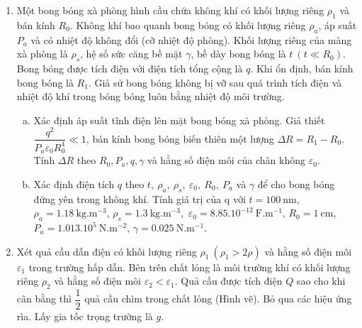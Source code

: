 \begin{vd}
\begin{enumerate}[1)]
    \item Một bong bóng xà phòng hình cầu chứa không khí có khối lượng riêng ${{\rho}_{1}}$ và bán kính ${{R}_{0}}$. Không khí bao quanh bong bóng có khối lượng riêng ${{\rho }_{a}}$, áp suất ${{P}_{a}}$ và có nhiệt độ không đổi (cỡ nhiệt độ phòng). Khối lượng riêng của màng xà phòng là ${{\rho }_{s}}$, hệ số sức căng bề mặt $\gamma $, bề dày bong bóng là $t~(t\ll {{R}_{0}})$. Bong bóng được tích điện với điện tích tổng cộng là $q$. Khi ổn định, bán kính bong bóng là ${{R}_{1}}$. Giả sử bong bóng không bị vỡ sau quá trình tích điện và nhiệt độ khí trong bóng bóng luôn bằng nhiệt độ môi trường.
    \begin{enumerate}[a)]
        \item Xác định áp suất tĩnh điện lên mặt bong bóng xà phòng. Giả thiết $\dfrac{{{q}^{2}}}{{{P}_{a}}{{\varepsilon }_{0}}R_{0}^{4}}\ll 1$, bán kính bong bóng biến thiên một lượng $\Delta R={{R}_{1}}-{{R}_{0}}$. Tính $\Delta R$ theo ${{R}_{0}},{{P}_{a}},q,\gamma $ và hằng số điện môi của chân không ${{\varepsilon }_{0}}$.
        \item Xác định điện tích $q$ theo $t,~{{\rho }_{a}},~{{\rho }_{s}},~{{\varepsilon }_{0}},~{{R}_{0}},~{{P}_{a}}$ và $\gamma $ để cho bong bóng đứng yên trong không khí. Tính giá trị của q với $t=100~\mathrm{nm}$, ${{\rho }_{a}}=1.18~\mathrm{kg}.{{\mathrm{m}}^{-3}}$, ${{\rho}_{s}}=1.3~\mathrm{kg}.{{\mathrm{m}}^{-3}}$,~${{\varepsilon }_{0}}=8.{{85.10}^{-12}}~\mathrm{F}.{{\mathrm{m}}^{-1}}$, ${{R}_{0}}=1~\mathrm{cm}$, ${{P}_{a}}=1.{{013.10}^{5}}~\mathrm{N}.{{\mathrm{m}}^{-2}}$, $\gamma =0.025~\mathrm{N}.{{\mathrm{m}}^{-1}}$.
    \end{enumerate}
    \item Xét quả cầu dẫn điện có khối lượng riêng ${{\rho }_{1}}~({{\rho }_{1}}>2\rho)$ và hằng số điện môi ${{\varepsilon }_{1}}$ trong trường hấp dẫn. Bên trên chất lỏng là môi trường khí có khối lượng riêng ${{\rho }_{2}}$ và hằng số điện môi ${{\varepsilon }_{2}}<{{\varepsilon }_{1}}$. Quả cầu được tích điện $Q$ sao cho khi cân bằng thì $\dfrac{1}{2}$ quả cầu chìm trong chất lỏng (Hình vẽ). Bỏ qua các hiệu ứng rìa. Lấy gia tốc trọng trường là $g$.
    \begin{center}
        



\end{center}
\end{enumerate}
\end{vd}
